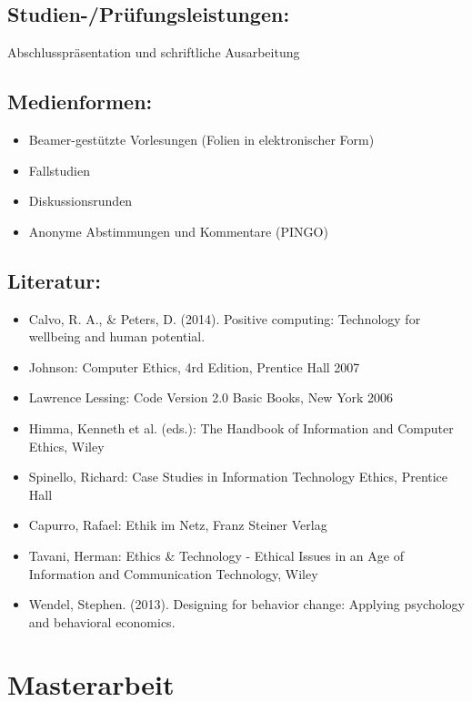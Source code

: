 \section*{Studien-/Prüfungsleistungen:}\label{studien-pruxfcfungsleistungen}

Abschlusspräsentation und schriftliche Ausarbeitung

\section*{Medienformen:}\label{medienformen}

\begin{itemize}
\tightlist
\item
  Beamer-gestützte Vorlesungen (Folien in elektronischer Form)
\item
  Fallstudien
\item
  Diskussionsrunden
\item
  Anonyme Abstimmungen und Kommentare (PINGO)
\end{itemize}

\section*{Literatur:}\label{literatur}

\begin{itemize}
\tightlist
\item
  Calvo, R. A., \& Peters, D. (2014). Positive computing: Technology for
  wellbeing and human potential.
\item
  Johnson: Computer Ethics, 4rd Edition, Prentice Hall 2007
\item
  Lawrence Lessing: Code Version 2.0 Basic Books, New York 2006
\item
  Himma, Kenneth et al. (eds.): The Handbook of Information and Computer
  Ethics, Wiley
\item
  Spinello, Richard: Case Studies in Information Technology Ethics,
  Prentice Hall
\item
  Capurro, Rafael: Ethik im Netz, Franz Steiner Verlag
\item
  Tavani, Herman: Ethics \& Technology - Ethical Issues in an Age of
  Information and Communication Technology, Wiley
\item
  Wendel, Stephen. (2013). Designing for behavior change: Applying
  psychology and behavioral economics.
\end{itemize}

\chapter{Masterarbeit}\label{masterarbeit}

